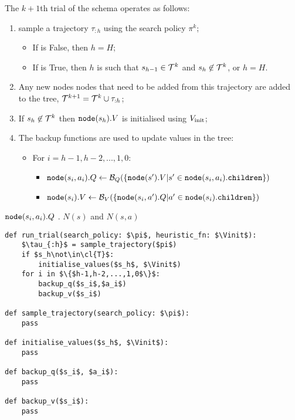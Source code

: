         The $k+1$th trial of the \thtspp\ewe schema operates as follows: 
        \begin{enumerate}
            \item sample a trajectory $\tau_{:h}$ using the search policy $\pi^{k}$;
            \begin{itemize}
                \item If \mctsmode\ewe is False, then $h=H$;
                \item If \mctsmode\ewe is True, then $h$ is such that $s_{h-1}\in\mathcal{T}^k$ and $s_h\not\in\mathcal{T}^k$, or $h=H$.
            \end{itemize}
            \item Any new nodes nodes that need to be added from this trajectory are added to the tree, $\mathcal{T}^{k+1} = \mathcal{T}^k \cup \tau_{:h}$;
            \item If $s_h\not\in\mathcal{T}^k$ then ${\textnormal{\texttt{node}}}(s_h).V$ is initialised using $V_{\textnormal{init}}$;
            \item The backup functions are used to update values in the tree:
            \begin{itemize}
                \item For $i={h-1,h-2,...,1,0}$:
                \begin{itemize}
                    \item ${\textnormal{\texttt{node}}}(s_i,a_i).Q \leftarrow \mathcal{B}_Q(\{{\textnormal{\texttt{node}}}(s').V | s'\in{\textnormal{\texttt{node}}}(s_i,a_i).{\textnormal{\texttt{children}}}\})$
                    \item ${\textnormal{\texttt{node}}}(s_i).V \leftarrow \mathcal{B}_V(\{{\textnormal{\texttt{node}}}(s_i,a').Q | a'\in{\textnormal{\texttt{node}}}(s_i).{\textnormal{\texttt{children}}}\})$
                \end{itemize}
            \end{itemize}
        \end{enumerate}

         ${\textnormal{\texttt{node}}}(s_i,a_i).Q$ .  $N(s)$ and $N(s,a)$
        \begin{lstlisting}
def run_trial(search_policy: $\pi$, heuristic_fn: $\Vinit$):
    $\tau_{:h}$ = sample_trajectory($pi$)
    if $s_h\not\in\cl{T}$:
        initialise_values($s_h$, $\Vinit$)
    for i in $\{$h-1,h-2,...,1,0$\}$:
        backup_q($s_i$,$a_i$)
        backup_v($s_i$)

def sample_trajectory(search_policy: $\pi$):
    pass

def initialise_values($s_h$, $\Vinit$):
    pass 

def backup_q($s_i$, $a_i$):
    pass
    
def backup_v($s_i$):
    pass
        \end{lstlisting}

